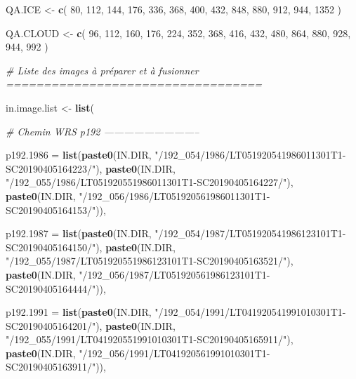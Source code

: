 \documentclass[a4paper, notitlepage, 12pt, krantz2]{krantz}
\newenvironment{Shaded}{\begin{snugshade}}{\end{snugshade}}
\newcommand{\CommentTok}[1]{\textcolor[rgb]{0.56,0.35,0.01}{\textit{#1}}}
\newcommand{\DataTypeTok}[1]{\textcolor[rgb]{0.13,0.29,0.53}{#1}}
\newcommand{\DecValTok}[1]{\textcolor[rgb]{0.00,0.00,0.81}{#1}}
\newcommand{\KeywordTok}[1]{\textcolor[rgb]{0.13,0.29,0.53}{\textbf{#1}}}
\newcommand{\NormalTok}[1]{#1}
\newcommand{\StringTok}[1]{\textcolor[rgb]{0.31,0.60,0.02}{#1}}
\begin{document}
\begin{Shaded}
\begin{Highlighting}[]
\NormalTok{QA.ICE <-}\StringTok{ }\KeywordTok{c}\NormalTok{(}
  \DecValTok{80}\NormalTok{, }\DecValTok{112}\NormalTok{, }\DecValTok{144}\NormalTok{, }\DecValTok{176}\NormalTok{,}
  \DecValTok{336}\NormalTok{, }\DecValTok{368}\NormalTok{, }\DecValTok{400}\NormalTok{, }\DecValTok{432}\NormalTok{, }\DecValTok{848}\NormalTok{, }\DecValTok{880}\NormalTok{, }\DecValTok{912}\NormalTok{, }\DecValTok{944}\NormalTok{, }\DecValTok{1352}
\NormalTok{)}

\NormalTok{QA.CLOUD <-}\StringTok{ }\KeywordTok{c}\NormalTok{(}
  \DecValTok{96}\NormalTok{, }\DecValTok{112}\NormalTok{, }\DecValTok{160}\NormalTok{, }\DecValTok{176}\NormalTok{, }\DecValTok{224}\NormalTok{,}
  \DecValTok{352}\NormalTok{, }\DecValTok{368}\NormalTok{, }\DecValTok{416}\NormalTok{, }\DecValTok{432}\NormalTok{, }\DecValTok{480}\NormalTok{, }\DecValTok{864}\NormalTok{, }\DecValTok{880}\NormalTok{, }\DecValTok{928}\NormalTok{, }\DecValTok{944}\NormalTok{, }\DecValTok{992}
\NormalTok{)}

\CommentTok{# Liste des images à préparer et à fusionner ==================================}

\NormalTok{in.image.list <-}\StringTok{ }\KeywordTok{list}\NormalTok{(}

  \CommentTok{# Chemin WRS p192 -----------------------------}

  \DataTypeTok{p192.1986 =} \KeywordTok{list}\NormalTok{(}\KeywordTok{paste0}\NormalTok{(IN.DIR, }\StringTok{"/192_054/1986/LT051920541986011301T1-SC20190405164223/"}\NormalTok{),}
                   \KeywordTok{paste0}\NormalTok{(IN.DIR, }\StringTok{"/192_055/1986/LT051920551986011301T1-SC20190405164227/"}\NormalTok{),}
                   \KeywordTok{paste0}\NormalTok{(IN.DIR, }\StringTok{"/192_056/1986/LT051920561986011301T1-SC20190405164153/"}\NormalTok{)),}

  \DataTypeTok{p192.1987 =} \KeywordTok{list}\NormalTok{(}\KeywordTok{paste0}\NormalTok{(IN.DIR, }\StringTok{"/192_054/1987/LT051920541986123101T1-SC20190405164150/"}\NormalTok{),}
                   \KeywordTok{paste0}\NormalTok{(IN.DIR, }\StringTok{"/192_055/1987/LT051920551986123101T1-SC20190405163521/"}\NormalTok{),}
                   \KeywordTok{paste0}\NormalTok{(IN.DIR, }\StringTok{"/192_056/1987/LT051920561986123101T1-SC20190405164444/"}\NormalTok{)),}

  \DataTypeTok{p192.1991 =} \KeywordTok{list}\NormalTok{(}\KeywordTok{paste0}\NormalTok{(IN.DIR, }\StringTok{"/192_054/1991/LT041920541991010301T1-SC20190405164201/"}\NormalTok{),}
                   \KeywordTok{paste0}\NormalTok{(IN.DIR, }\StringTok{"/192_055/1991/LT041920551991010301T1-SC20190405165911/"}\NormalTok{),}
                   \KeywordTok{paste0}\NormalTok{(IN.DIR, }\StringTok{"/192_056/1991/LT041920561991010301T1-SC20190405163911/"}\NormalTok{)),}


\end{Highlighting}
\end{Shaded}
\end{document}
